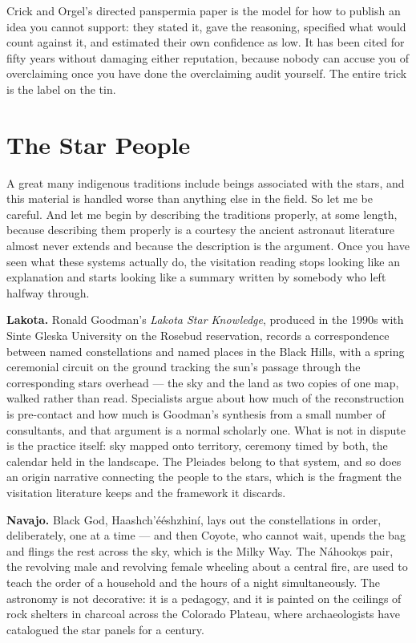 \begin{funfact}
Crick and Orgel's directed panspermia paper is the model for how to publish an idea you cannot
support: they stated it, gave the reasoning, specified what would count against it, and estimated
their own confidence as low. It has been cited for fifty years without damaging either reputation,
because nobody can accuse you of overclaiming once you have done the overclaiming audit yourself.
The entire trick is the label on the tin.
\end{funfact}

\section{The Star People}\label{sec:starpeople}

A great many indigenous traditions include beings associated with the stars, and this material
is handled worse than anything else in the field. So let me be careful. And let me begin by
describing the traditions properly, at some length, because describing them properly is a
courtesy the ancient astronaut literature almost never extends and because the description is
the argument. Once you have seen what these systems actually do, the visitation reading stops
looking like an explanation and starts looking like a summary written by somebody who left
halfway through.

\textbf{Lakota.} Ronald Goodman's \emph{Lakota Star Knowledge}, produced in the 1990s with Sinte
Gleska University on the Rosebud reservation, records a correspondence between named
constellations and named places in the Black Hills, with a spring ceremonial circuit on the
ground tracking the sun's passage through the corresponding stars overhead --- the sky and the
land as two copies of one map, walked rather than read. Specialists argue about how much of the
reconstruction is pre-contact and how much is Goodman's synthesis from a small number of
consultants, and that argument is a normal scholarly one. What is not in dispute is the practice
itself: sky mapped onto territory, ceremony timed by both, the calendar held in the landscape.
The Pleiades belong to that system, and so does an origin narrative connecting the people to the
stars, which is the fragment the visitation literature keeps and the framework it discards.

\textbf{Navajo.} Black God, Haashch'\'e\'eshzhin\'i, lays out the constellations in order,
deliberately, one at a time --- and then Coyote, who cannot wait, upends the bag and flings the
rest across the sky, which is the Milky Way. The N\'ahook\d{o}s pair, the revolving male and
revolving female wheeling about a central fire, are used to teach the order of a household and
the hours of a night simultaneously. The astronomy is not decorative: it is a pedagogy, and it
is painted on the ceilings of rock shelters in charcoal across the Colorado Plateau, where
archaeologists have catalogued the star panels for a century.

